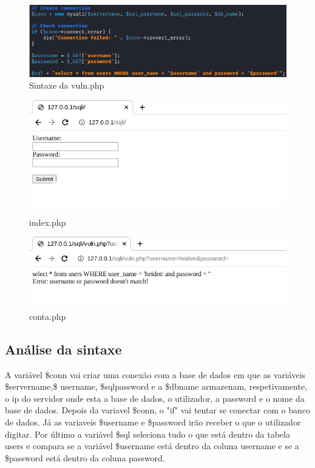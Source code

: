 \documentclass{report}
\begin{document}
\begin{figure}[!htb]
\centering
{}
  \includegraphics[width=\linewidth]{imagessqlcode/sqlcode1.png}
  \caption{Sintaxe da vuln.php}\label{fig:vuln.php}
\endminipage
\end{figure}
\begin{figure}[!htb]
\centering
{}
  \includegraphics[width=\linewidth]{imagessql/Fig1.png}
  \caption{index.php}\label{fig:index.php}
\endminipage\hfill
{}
  \includegraphics[width=\linewidth]{imagessql/Fig2.png}
  \caption{conta.php}\label{conta.php}
\endminipage
\end{figure}

\clearpage	
\subsection{Análise da sintaxe}

A variável \$conn vai criar uma conexão com a base de dados em que as variáveis \$servername,\$  \sql\textunderscore username, \$sql\textunderscore password e a \$db\textunderscore name armazenam, respetivamente, o ip do servidor onde esta a base de dados, o utilizador, a password e o nome da base de dados. Depois da variavel \$conn, o "if"  vai tentar se conectar com o banco de dados. Já as variaveis \$username e \$password irão receber o que o utilizador digitar.
Por último a variável \$sql seleciona tudo o que está dentro da tabela users e compara se a variável \$username está dentro da coluna user\textunderscore name e se a \$password está dentro da coluna password.
\end{document}
